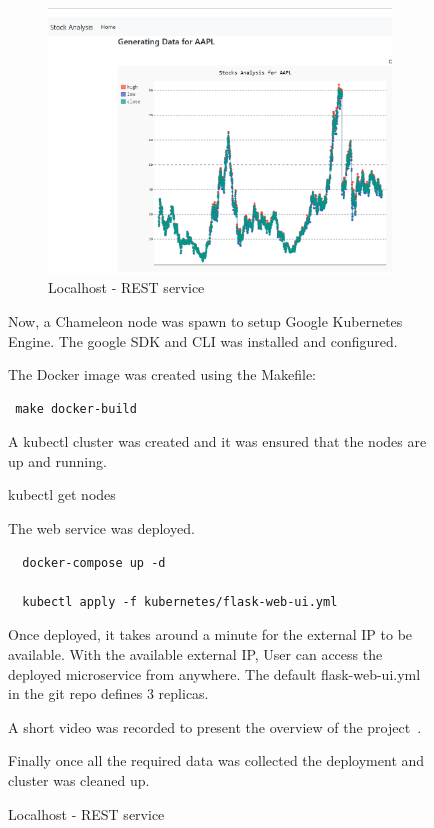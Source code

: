 \begin{figure}[htb]
\begin{figure}[htb]
	\centering\includegraphics[width=\columnwidth]{images/hid_417_localhost.png}
  \caption{Localhost - REST service}
  \label{fig:project_localhost}
\end{figure}

Now, a Chameleon node was spawn to setup Google Kubernetes Engine. The google
SDK and CLI was installed and configured. 

The Docker image was created using the Makefile:
\begin{verbatim}
 make docker-build
\end{verbatim}
A kubectl cluster was created and it was ensured that the nodes are up and
running.

kubectl get nodes

The web service was deployed.

\begin{verbatim}
  docker-compose up -d

  kubectl apply -f kubernetes/flask-web-ui.yml
\end{verbatim}

Once deployed, it takes around a minute for the external IP to be available.
With the available external IP, User can access the deployed microservice from
anywhere. The default flask-web-ui.yml in the git repo defines 3 replicas.

A short video was recorded to present the overview of the
project~\cite{hid-sp18-417-project_overview}.

Finally once all the required data was collected the deployment and cluster
was cleaned up.


\end{figure}
